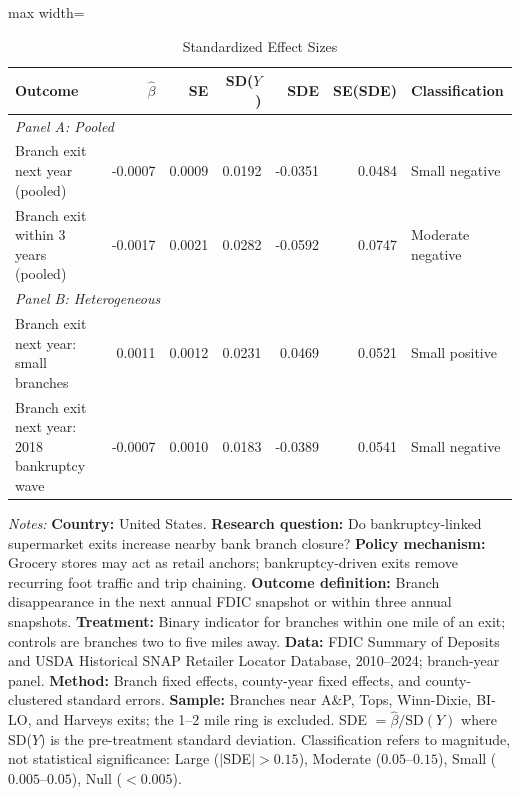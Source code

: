 \begin{table}[H]
\centering
\caption{Standardized Effect Sizes}
\begin{threeparttable}
\begin{adjustbox}{max width=\textwidth}
\begin{tabular}{p{4.2cm}rrrrrp{2.3cm}}
\toprule
Outcome & $\hat{\beta}$ & SE & SD($Y$) & SDE & SE(SDE) & Classification \\
\midrule
\multicolumn{7}{l}{\textit{Panel A: Pooled}} \\
Branch exit next year (pooled) & -0.0007 & 0.0009 & 0.0192 & -0.0351 & 0.0484 & Small negative \\
Branch exit within 3 years (pooled) & -0.0017 & 0.0021 & 0.0282 & -0.0592 & 0.0747 & Moderate negative \\
\midrule
\multicolumn{7}{l}{\textit{Panel B: Heterogeneous}} \\
Branch exit next year: small branches & 0.0011 & 0.0012 & 0.0231 & 0.0469 & 0.0521 & Small positive \\
Branch exit next year: 2018 bankruptcy wave & -0.0007 & 0.0010 & 0.0183 & -0.0389 & 0.0541 & Small negative \\
\bottomrule
\end{tabular}
\end{adjustbox}
\begin{tablenotes}[flushleft]
\small
\item \textit{Notes:} \textbf{Country:} United States. \textbf{Research question:} Do bankruptcy-linked supermarket exits increase nearby bank branch closure? \textbf{Policy mechanism:} Grocery stores may act as retail anchors; bankruptcy-driven exits remove recurring foot traffic and trip chaining. \textbf{Outcome definition:} Branch disappearance in the next annual FDIC snapshot or within three annual snapshots. \textbf{Treatment:} Binary indicator for branches within one mile of an exit; controls are branches two to five miles away. \textbf{Data:} FDIC Summary of Deposits and USDA Historical SNAP Retailer Locator Database, 2010--2024; branch-year panel. \textbf{Method:} Branch fixed effects, county-year fixed effects, and county-clustered standard errors. \textbf{Sample:} Branches near A\&P, Tops, Winn-Dixie, BI-LO, and Harveys exits; the 1--2 mile ring is excluded. SDE $= \hat{\beta} / \text{SD}(Y)$ where SD($Y$) is the pre-treatment standard deviation. Classification refers to magnitude, not statistical significance: Large ($|$SDE$| > 0.15$), Moderate ($0.05$--$0.15$), Small ($0.005$--$0.05$), Null ($< 0.005$).
\end{tablenotes}
\end{threeparttable}
\label{tab:sde}
\end{table}
